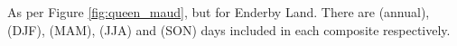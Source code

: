 \label{fig:enderby}
As per Figure \ref{fig:queen_maud}, but for Enderby Land. There are (annual),  (DJF),  (MAM),  (JJA) and  (SON) days included in each composite respectively.